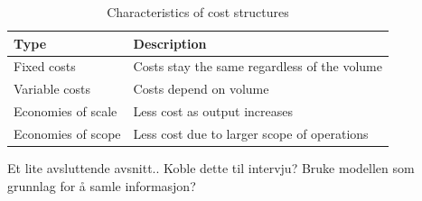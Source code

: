 \begin{table}
\centering
 \caption[Characteristics of cost structures]{Characteristics of cost structures}
    \begin{tabular}{|l|l|}
        \hline
        \textbf{Type} & \textbf{Description} \\ \hline
       Fixed costs & Costs stay the same regardless of the volume  \\ \hline
       Variable costs & Costs depend on volume \\ \hline
       Economies of scale & Less cost as output increases \\ \hline
	   Economies of scope & Less cost due to larger scope of operations \\ \hline
    \end{tabular}
    \label{tab:cost}
\end{table}

Et lite avsluttende avsnitt.. Koble dette til intervju? Bruke modellen som grunnlag for å samle informasjon?
